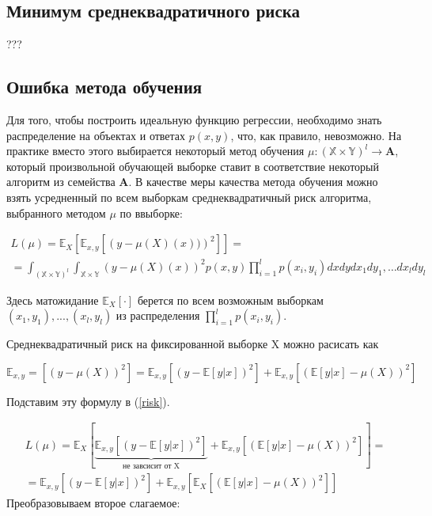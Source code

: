 \documentclass{article}
\theoremstyle{definition}
\theoremstyle{theorem}
\theoremstyle{remark}
\theoremstyle{theorem}
\theoremstyle{example}
\theoremstyle{theorem}
\theoremstyle{theorem}
\theoremstyle{theorem}
\theoremstyle{theorem}
\begin{document}
\subsection{Минимум среднеквадратичного риска}

???

\subsection{Ошибка метода обучения}

Для того, чтобы построить идеальную функцию регрессии, необходимо знать распределение на объектах и ответах $p(x, y)$, что, как правило, невозможно. На практике вместо этого выбирается некоторый метод обучения $\mu : (\mathbb{X}\times\mathbb{Y})^l \rightarrow \mathbf{A}$, который произвольной обучающей выборке ставит в соответствие некоторый алгоритм из семейства $\mathbf{A}$. В качестве меры качества метода обучения можно взять усредненный
по всем выборкам среднеквадратичный риск алгоритма, выбранного методом $\mu$ по ввыборке:

\begin{multline}
	L(\mu) = \mathbb{E}_X\left[\mathbb{E}_{x,y}\left[ \left(y-\mu(X)(x))\right)^2\right]\right] =  \\ =\int_{(\mathbb{X}\times\mathbb{Y})^l}\int_{\mathbb{X}\times\mathbb{Y}} \left(y-\mu(X)(x)\right)^2 p(x,y)\prod^l_{i=1}p(x_i,y_i)dxdydx_1dy_1,\ldots dx_ldy_l
	\label{risk}
\end{multline}

Здесь матожидание $\mathbb{E}_X[\cdot]$ берется по всем возможным выборкам ${(x_1, y_1), . . . ,(x_l, y_l)}$
из распределения $\prod_{i=1}^{l}p(x_i,y_i)$.

Среднеквадратичный риск на фиксированной выборке X можно расисать как

$\mathbb{E}_{x,y} = \left[(y-\mu(X))^2\right] = \mathbb{E}_{x,y}\left[(y-\mathbb{E}[y|x])^2\right] + \mathbb{E}_{x,y}\left[(\mathbb{E}[y|x] - \mu(X))^2\right]$

Подставим эту формулу в (\ref{risk}).

\begin{equation}
	\begin{split}
	L(\mu) = \mathbb{E}_X\left[\underbrace{\mathbb{E}_{x,y}\left[(y-\mathbb{E}[y|x])^2\right]}_{\text{не завсисит от X}} + \mathbb{E}_{x,y}\left[(\mathbb{E}[y|x] - \mu(X))^2\right]\right] = \\
	= \mathbb{E}_{x,y}\left[(y-\mathbb{E}[y|x])^2\right] + \mathbb{E}_{x,y}\left[\mathbb{E}_X \left[(\mathbb{E}[y|x]- \mu(X))^2\right]\right]
\end{split}
\label{2.2}
\end{equation}
Преобразовываем второе слагаемое:
\end{document}
